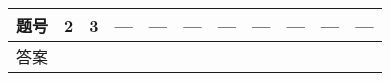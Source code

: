 
\begin{tabularx}{0.92\textwidth}{|c|Y|Y|Y|Y|Y|Y|Y|Y|Y|Y|}
\hline
题号 & 2 & 3 & --- & --- & --- & --- & --- & --- & --- & ---\\
\hline
答案 & & & & & & & & & &\\
\hline
\end{tabularx}
